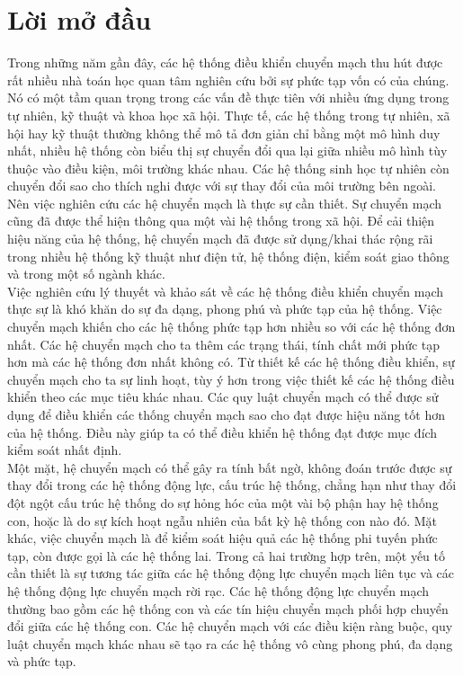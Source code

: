 \documentclass[14pt,a4paper,oneside]{report}		%
\theoremstyle{definition}
\begin{document}
\chapter*{Lời mở đầu}
Trong những năm gần đây, các hệ thống điều khiển chuyển mạch thu hút được rất nhiều nhà toán học quan tâm nghiên cứu bởi sự phức tạp vốn có của chúng. Nó có một tầm quan trọng trong các vấn đề thực tiên với nhiều ứng dụng trong tự nhiên, kỹ thuật và khoa học xã hội. Thực tế, các hệ thống trong tự nhiên, xã hội hay kỹ thuật thường không thể mô tả đơn giản chỉ bằng một mô hình duy nhất, nhiều hệ thống còn biểu thị sự chuyển đổi qua lại giữa nhiều mô hình tùy thuộc vào điều kiện, môi trường khác nhau. Các hệ thống sinh học tự nhiên còn chuyển đổi sao cho thích nghi được với sự thay đổi của môi trường bên ngoài. Nên việc nghiên cứu các hệ chuyển mạch là thực sự cần thiết. Sự chuyển mạch cũng đã được thể hiện thông qua một vài hệ thống trong xã hội. Để cải thiện hiệu năng của hệ thống, hệ chuyển mạch đã được sử dụng/khai thác rộng rãi trong nhiều hệ thống kỹ thuật như điện tử, hệ thống điện, kiểm soát giao thông và trong một số ngành khác.\\

Việc nghiên cứu lý thuyết và khảo sát về các hệ thống điều khiển chuyển mạch thực sự là khó khăn do sự đa dạng, phong phú và phức tạp của hệ thống. Việc chuyển mạch khiến cho các hệ thống phức tạp hơn nhiều so với các hệ thống đơn nhất. Các hệ chuyển mạch cho ta thêm các trạng thái, tính chất mới phức tạp hơn mà các hệ thống đơn nhất không có. Từ thiết kế các hệ thống điều khiển, sự chuyển mạch cho ta sự linh hoạt, tùy ý hơn trong việc thiết kế các hệ thống điều khiển theo các mục tiêu khác nhau. Các quy luật chuyển mạch có thể được sử dụng để điều khiển các thống chuyển mạch sao cho đạt được hiệu năng tốt hơn của hệ thống. Điều này giúp ta có thể điều khiển hệ thống đạt được mục đích kiểm soát nhất định.\\

Một mặt, hệ chuyển mạch có thể gây ra tính bất ngờ, không đoán trước được sự thay đổi trong các hệ thống động lực, cấu trúc hệ thống, chẳng hạn như thay đổi đột ngột cấu trúc hệ thống do sự hỏng hóc của một vài bộ phận hay hệ thống con, hoặc là do sự kích hoạt ngẫu nhiên của bất kỳ hệ thống con nào đó. Mặt khác, việc chuyển mạch là để kiểm soát hiệu quả các hệ thống phi tuyến phức tạp, còn được gọi là các hệ thống lai. Trong cả hai trường hợp trên, một yếu tố cần thiết là sự tương tác giữa các hệ thống động lực chuyển mạch liên tục và các hệ thống động lực chuyển mạch rời rạc. Các hệ thống động lực chuyển mạch thường bao gồm các hệ thống con và các tín hiệu chuyển mạch phối hợp chuyển đổi giữa các hệ thống con. Các hệ chuyển mạch với các điều kiện ràng buộc, quy luật chuyển mạch khác nhau sẽ tạo ra các hệ thống vô cùng phong phú, đa dạng và phức tạp.\\
\end{document}
